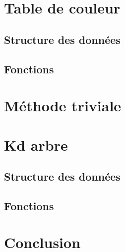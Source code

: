 \documentclass[a4paper,11pt,final]{article}
\begin{document}
\section{Table de couleur}
\subsection{Structure des données}
\subsection{Fonctions}
\section{Méthode triviale}
\section{Kd arbre}
\subsection{Structure des données}
\subsection{Fonctions}
\section{Conclusion}
\end{document}
